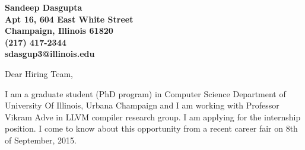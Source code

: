 \documentclass[11pt]{letter} %
\newcommand{\cmt}[1]{}
\begin{document}

\begin{letter}{
  \cmt{
  Jane Smith \\
Recruitment Officer \\
The Corporation \\
123 Pleasant Lane \\
City, State 12345
  }
} 


\begin{center}
\large\bf Sandeep Dasgupta \\ %
Apt 16, 604 East White Street \\ Champaign, Illinois 61820 \\ (217) 417-2344  \\ sdasgup3@illinois.edu%
\end{center} 
\vfill

\signature{Sandeep Dasgupta} %


\opening{Dear Hiring Team,} 
 
I am a graduate student (PhD program) in Computer Science Department of
University Of Illinois, Urbana Champaign and I am working with Professor Vikram
Adve in LLVM compiler research group.  I am applying for the internship position.  
I come to know about this opportunity from a recent career fair on 8th of September, 2015.


\end{letter}
\end{document}
